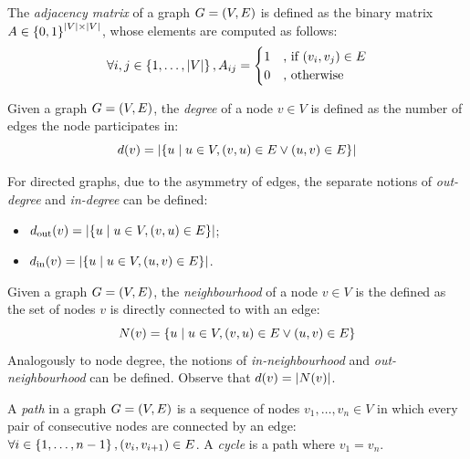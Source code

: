 \begin{definition}
The \emph{adjacency matrix} of a graph $G=\mathopen{}\left(V, E\right)$ is defined as the binary matrix $A \in \mathopen{}\left\{0,1\right\}^{\mathopen{}\left|V\right| \times \mathopen{}\left|V\right|}$, whose elements are computed as follows:
\begin{equation}
\forall i,j \in \mathopen{}\left\{1, \dots, \mathopen{}\left|V\right|\right\}, A_{ij} = \begin{cases}1 &\text{, if }\mathopen{}\left(v_i, v_j\right) \in E \\ 0 & \text{, otherwise} \end{cases}
\end{equation}
\end{definition}

\begin{definition}
Given a graph $G=\mathopen{}\left(V, E\right)$, the \emph{degree} of a node $v \in V$ is defined as the number of edges the node participates in: 
\begin{equation}
d\mathopen{}\left(v\right) = \mathopen{}\left|\mathopen{}\left\{u \mid u \in V, \mathopen{}\left(v, u\right) \in E \vee \mathopen{}\left(u, v\right) \in E \right\}\right|
\end{equation}

For directed graphs, due to the asymmetry of edges, the separate notions of \emph{out-degree} and \emph{in-degree} can be defined:
\begin{itemize}
\item $d_{\text{out}}\mathopen{}\left(v\right) = \mathopen{}\left|\mathopen{}\left\{u \mid u \in V, \mathopen{}\left(v, u\right) \in E \right\}\right|$;
\item $d_{\text{in}}\mathopen{}\left(v\right) = \mathopen{}\left|\mathopen{}\left\{u \mid u \in V, \mathopen{}\left(u, v\right) \in E \right\}\right|$.
\end{itemize}
\end{definition}

\begin{definition}
Given a graph $G=\mathopen{}\left(V, E\right)$, the \emph{neighbourhood} of a node $v \in V$ is the defined as the set of nodes $v$ is directly connected to with an edge: \begin{equation}
N\mathopen{}\left(v\right)=\mathopen{}\left\{u \mid u\in V, \mathopen{}\left(v,u\right) \in E \vee \mathopen{}\left(u,v\right) \in E \right\}
\end{equation} 
Analogously to node degree, the notions of \emph{in-neighbourhood} and \emph{out-neighbourhood} can be defined. Observe that $d\mathopen{}\left(v\right)=\mathopen{}\left|N\mathopen{}\left(v\right)\right|$.
\end{definition}

\begin{definition}
A \emph{path} in a graph $G=\mathopen{}\left(V, E\right)$ is a sequence of nodes $v_1,\dots,v_n \in V$ in which every pair of consecutive nodes are connected by an edge: $\forall i \in \mathopen{}\left\{1,\dots,n-1\right\},\mathopen{}\left(v_i,v_{i+1}\right)\in E$. A \emph{cycle} is a path where $v_1=v_n$.
\end{definition}

